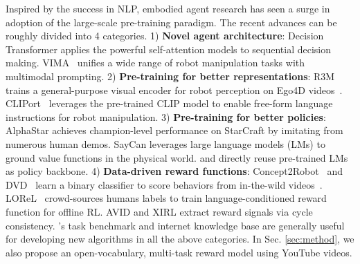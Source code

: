 \vspace{-0.05in}
Inspired by the success in NLP, embodied agent research has seen a surge in adoption of the large-scale pre-training paradigm. The recent advances can be roughly divided into 4 categories. 
1) \textbf{Novel agent architecture}: Decision Transformer \cite{ranzato2021decisiontransformer,janner2021onebigsequence,zheng2022onlinedt} applies the powerful self-attention models to sequential decision making.  VIMA~\cite{jiang2022vima} unifies a wide range of robot manipulation tasks with multimodal prompting. 
2)  \textbf{Pre-training for better representations}: R3M~\cite{nair2022r3m} trains a general-purpose visual encoder for robot perception on Ego4D videos~\cite{grauman2021ego4d}. CLIPort~\cite{shridhar2021cliport} leverages the pre-trained CLIP model \cite{radford2021clip} to enable free-form language instructions for robot manipulation. 
3) \textbf{Pre-training for better policies}: AlphaStar \cite{vinyals2019alphastar} achieves champion-level performance on StarCraft by imitating from numerous human demos. SayCan \cite{ahn2022saycan} leverages large language models (LMs) to ground value functions in the physical world. \cite{li2022pretrained} and \cite{reid2022wikipedia} directly reuse pre-trained LMs as policy backbone.  
4) \textbf{Data-driven reward functions}: Concept2Robot~\cite{shao2021concept2robot} and DVD~\cite{nair2021dvd} learn a binary classifier to score behaviors from in-the-wild videos~\cite{goyal2017something}. LOReL~\cite{nair2021lorel} crowd-sources humans labels to train language-conditioned reward function for offline RL. AVID \cite{smith2019avid} and XIRL \cite{zakka2021xirl} extract reward signals via cycle consistency. 
\minedojo's task benchmark and internet knowledge base are generally useful for developing new algorithms in all the above categories. In Sec. \ref{sec:method}, we also propose an open-vocabulary, multi-task reward model using \minedojo YouTube videos.

